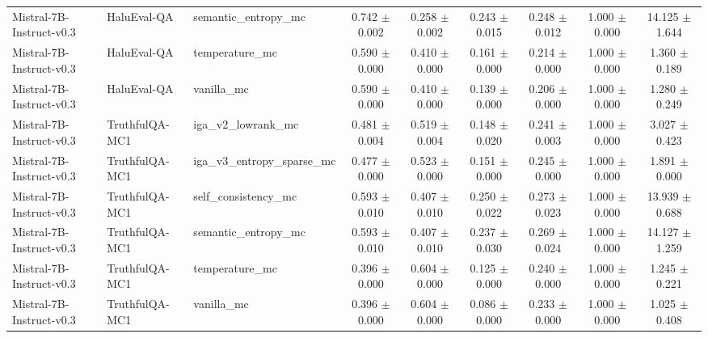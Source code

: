 \begin{table}[t]
\begin{tabular}{lllcccccc}
Mistral-7B-Instruct-v0.3 & HaluEval-QA & semantic\_entropy\_mc & 0.742 $\pm$ 0.002 & 0.258 $\pm$ 0.002 & 0.243 $\pm$ 0.015 & 0.248 $\pm$ 0.012 & 1.000 $\pm$ 0.000 & 14.125 $\pm$ 1.644 \\
Mistral-7B-Instruct-v0.3 & HaluEval-QA & temperature\_mc & 0.590 $\pm$ 0.000 & 0.410 $\pm$ 0.000 & 0.161 $\pm$ 0.000 & 0.214 $\pm$ 0.000 & 1.000 $\pm$ 0.000 & 1.360 $\pm$ 0.189 \\
Mistral-7B-Instruct-v0.3 & HaluEval-QA & vanilla\_mc & 0.590 $\pm$ 0.000 & 0.410 $\pm$ 0.000 & 0.139 $\pm$ 0.000 & 0.206 $\pm$ 0.000 & 1.000 $\pm$ 0.000 & 1.280 $\pm$ 0.249 \\
Mistral-7B-Instruct-v0.3 & TruthfulQA-MC1 & iga\_v2\_lowrank\_mc & 0.481 $\pm$ 0.004 & 0.519 $\pm$ 0.004 & 0.148 $\pm$ 0.020 & 0.241 $\pm$ 0.003 & 1.000 $\pm$ 0.000 & 3.027 $\pm$ 0.423 \\
Mistral-7B-Instruct-v0.3 & TruthfulQA-MC1 & iga\_v3\_entropy\_sparse\_mc & 0.477 $\pm$ 0.000 & 0.523 $\pm$ 0.000 & 0.151 $\pm$ 0.000 & 0.245 $\pm$ 0.000 & 1.000 $\pm$ 0.000 & 1.891 $\pm$ 0.000 \\
Mistral-7B-Instruct-v0.3 & TruthfulQA-MC1 & self\_consistency\_mc & 0.593 $\pm$ 0.010 & 0.407 $\pm$ 0.010 & 0.250 $\pm$ 0.022 & 0.273 $\pm$ 0.023 & 1.000 $\pm$ 0.000 & 13.939 $\pm$ 0.688 \\
Mistral-7B-Instruct-v0.3 & TruthfulQA-MC1 & semantic\_entropy\_mc & 0.593 $\pm$ 0.010 & 0.407 $\pm$ 0.010 & 0.237 $\pm$ 0.030 & 0.269 $\pm$ 0.024 & 1.000 $\pm$ 0.000 & 14.127 $\pm$ 1.259 \\
Mistral-7B-Instruct-v0.3 & TruthfulQA-MC1 & temperature\_mc & 0.396 $\pm$ 0.000 & 0.604 $\pm$ 0.000 & 0.125 $\pm$ 0.000 & 0.240 $\pm$ 0.000 & 1.000 $\pm$ 0.000 & 1.245 $\pm$ 0.221 \\
Mistral-7B-Instruct-v0.3 & TruthfulQA-MC1 & vanilla\_mc & 0.396 $\pm$ 0.000 & 0.604 $\pm$ 0.000 & 0.086 $\pm$ 0.000 & 0.233 $\pm$ 0.000 & 1.000 $\pm$ 0.000 & 1.025 $\pm$ 0.408 \\
\bottomrule
\end{tabular}
\end{table}
